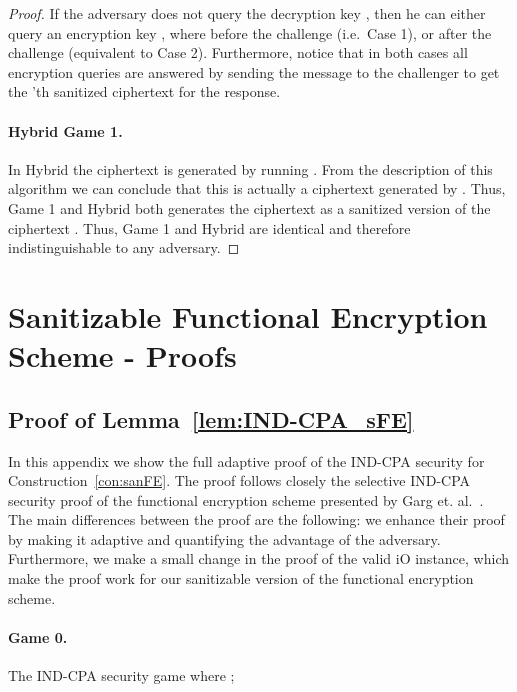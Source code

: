 \documentclass{llncs}
\begin{document}
\begin{proof}
If the adversary does not query the decryption key , then he can either query an encryption key , where  before the challenge (i.e.~Case 1), or after the challenge (equivalent to Case 2). 
Furthermore, notice that in both cases all encryption queries  are answered by sending the message to the challenger to get the 'th \oACE sanitized ciphertext for the response. 

\paragraph{Hybrid   Game 1.} 
In Hybrid  the ciphertext  is generated by running . From the description of this algorithm we can conclude that this is actually a ciphertext generated by . Thus, Game 1 and Hybrid  both generates the ciphertext  as a sanitized version of the ciphertext . Thus, Game 1 and Hybrid  are identical and therefore indistinguishable to any adversary.



\end{proof}









\section{Sanitizable Functional Encryption Scheme - Proofs}

\subsection{Proof of Lemma~\ref{lem:IND-CPA_sFE}}\label{app:IND-CPA_sFE}
\setcounter{claimcounter}{0}

In this appendix we show the full adaptive proof of the IND-CPA security for Construction~\ref{con:sanFE}. The proof follows closely the selective IND-CPA security proof of the functional encryption scheme presented by Garg et. al.~\cite{DBLP:conf/focs/GargGH0SW13}. 
The main differences between the proof are the following: we enhance their proof by making it adaptive and quantifying the advantage of the adversary. Furthermore, we make a small change in the proof of the valid iO instance, which make the proof work for our sanitizable version of the functional encryption scheme.

\paragraph{Game 0.} The IND-CPA security game where ;
\end{document}
